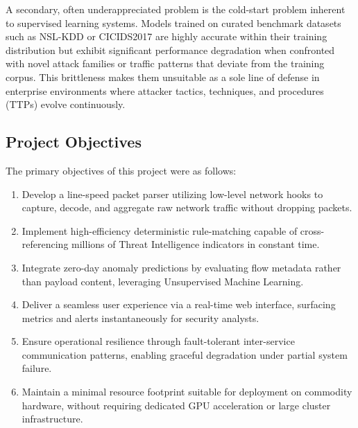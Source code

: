 \documentclass[conference]{IEEEtran}
\begin{document}
A secondary, often underappreciated problem is the cold-start problem inherent to supervised learning systems. Models trained on curated benchmark datasets such as NSL-KDD or CICIDS2017 are highly accurate within their training distribution but exhibit significant performance degradation when confronted with novel attack families or traffic patterns that deviate from the training corpus. This brittleness makes them unsuitable as a sole line of defense in enterprise environments where attacker tactics, techniques, and procedures (TTPs) evolve continuously.

\subsection{Project Objectives}
The primary objectives of this project were as follows:
\begin{enumerate}
    \item Develop a line-speed packet parser utilizing low-level network hooks to capture, decode, and aggregate raw network traffic without dropping packets.
    \item Implement high-efficiency deterministic rule-matching capable of cross-referencing millions of Threat Intelligence indicators in constant time.
    \item Integrate zero-day anomaly predictions by evaluating flow metadata rather than payload content, leveraging Unsupervised Machine Learning.
    \item Deliver a seamless user experience via a real-time web interface, surfacing metrics and alerts instantaneously for security analysts.
    \item Ensure operational resilience through fault-tolerant inter-service communication patterns, enabling graceful degradation under partial system failure.
    \item Maintain a minimal resource footprint suitable for deployment on commodity hardware, without requiring dedicated GPU acceleration or large cluster infrastructure.
\end{enumerate}
\end{document}
